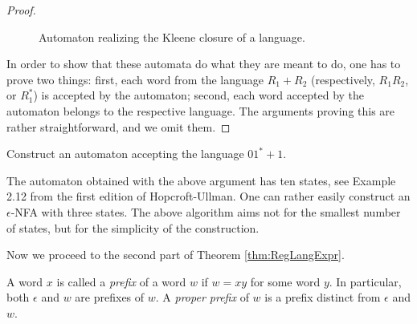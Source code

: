 \begin{page}
\begin{proof}
\begin{figure}[ht]
\begin{center}

\end{center}
\caption{Automaton realizing the Kleene closure of a language.}
\label{fig:AutomClosure}
\end{figure}

In order to show that these automata do what they are meant to do, one has to prove two things:
first, each word from the language $R_1 + R_2$ (respectively, $R_1R_2$, or $R_1^*$) is accepted by the automaton;
second, each word accepted by the automaton belongs to the respective language.
The arguments proving this are rather straightforward, and we omit them.
\end{proof}


\end{page}

\begin{page}
\setcounter{section}{2}
\setcounter{subsection}{2}
\setcounter{dfn}{8}
\label{portion:974}

\begin{exl}
Construct an automaton accepting the language $01^* + 1$.

The automaton obtained with the above argument has ten states, see Example 2.12 from the first edition of Hopcroft-Ullman.
One can rather easily construct an $\epsilon$-NFA with three states.
The above algorithm aims not for the smallest number of states, but for the simplicity of the construction.
\end{exl}

\end{page}

\begin{page}
\setcounter{section}{2}
\setcounter{subsection}{2}
\setcounter{dfn}{8}
\label{portion:975}


Now we proceed to the second part of Theorem \ref{thm:RegLangExpr}.


\end{page}

\begin{page}
\setcounter{section}{2}
\setcounter{subsection}{2}
\setcounter{dfn}{9}
\label{portion:977}

\begin{dfn}
A word $x$ is called a \emph{prefix} of a word $w$ if $w = xy$ for some word $y$.
In particular, both $\epsilon$ and $w$ are prefixes of $w$.
A \emph{proper prefix} of $w$ is a prefix distinct from $\epsilon$ and $w$.
\end{dfn}

\end{page}

